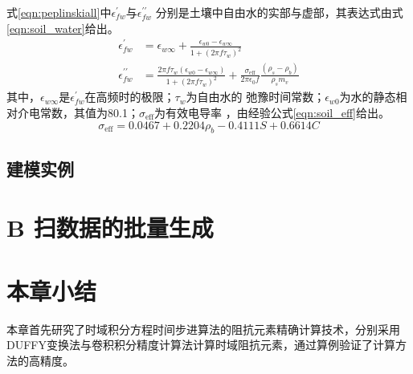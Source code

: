 式\ref{eqn:peplinskiall}中$\epsilon_{f w}^{\prime}$与$\epsilon_{f w}^{\prime \prime}$
分别是土壤中自由水的实部与虚部，其表达式由式\ref{eqn:soil_water}给出。
\begin{equation} 
	\label{eqn:soil_water}
	\begin{aligned}
		\epsilon_{f w}^{\prime}&=\epsilon_{w \infty}+\frac{\epsilon_{w 0}-\epsilon_{w \infty}}{1+\left(2 \pi f \tau_{w}\right)^{2}} \\
		\epsilon_{f w}^{\prime \prime}&=\frac{2 \pi f \tau_{w}\left(\epsilon_{w 0}-\epsilon_{w \infty}\right)}{1+\left(2 \pi f \tau_{w}\right)^{2}}+\frac{\sigma_{\mathrm{eff}}}{2 \pi \epsilon_{0} f} \frac{\left(\rho_{s}-\rho_{b}\right)}{\rho_{s} m_{v}}
	\end{aligned}
\end{equation}
其中，$\epsilon_{w \infty}$是$\epsilon_{f w}^{\prime}$在高频时的极限；$\tau_{w}$为自由水的
弛豫时间常数；$\epsilon_{w 0}$为水的静态相对介电常数，其值为80.1；$\sigma_{\mathrm{eff}}$为有效电导率
，由经验公式\ref{eqn:soil_eff}给出。
\begin{equation}
	\label{eqn:soil_eff}
\sigma_{\mathrm{eff}}=0.0467+0.2204 \rho_{b}-0.4111 S+0.6614 C
\end{equation}
\subsection{建模实例}
\section{B 扫数据的批量生成}
\section{本章小结}
本章首先研究了时域积分方程时间步进算法的阻抗元素精确计算技术，分别采用DUFFY变换法与卷积积分精度计算法计算时域阻抗元素，通过算例验证了计算方法的高精度。

